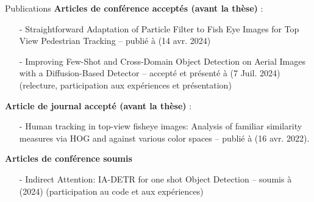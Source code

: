 \begin{subsectionframemod}{Publications}
    \textbf{Articles de conférence acceptés (avant la thèse)} :
    \begin{itemize}
        \item[-] Straightforward Adaptation of Particle Filter to Fish Eye Images for Top View Pedestrian Tracking -- publié à 
        (14 avr. 2024)
        \item[-] Improving Few-Shot and Cross-Domain Object Detection on Aerial Images with a Diffusion-Based Detector --
        accepté et présenté à  (7 Juil. 2024) (relecture, participation aux expériences et présentation)
    \end{itemize}

    \textbf{Article de journal accepté (avant la thèse)} :
    \begin{itemize}
        \item[-] Human tracking in top-view fisheye images: Analysis of familiar similarity measures via HOG
        and against various color spaces  -- publié à 
        (16 avr. 2022).
    \end{itemize}

    \textbf{Articles de conférence soumis}
    \begin{itemize}
        \item[-] Indirect Attention: IA-DETR for one shot Object Detection -- soumis à  (2024) (participation au code et aux expériences)
    \end{itemize}

\end{subsectionframemod}

